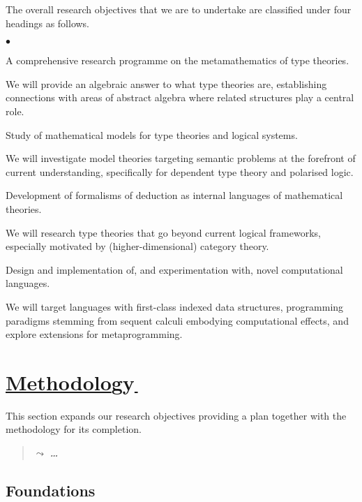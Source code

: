 \documentclass[11pt,twocolumn]{article}
\newenvironment{myitemize}
  {\begin{list}{$\bullet$}
  {\setlength{\topsep}{2pt}
   \setlength{\partopsep}{2pt}
   \setlength{\itemsep}{2.5pt}
   \setlength{\parsep}{2.5pt}
   \setlength{\leftmargin}{1em}
   \setlength{\labelwidth}{.5em}}}
  {\end{list}}
\newcommand{\note}[1]{\begin{quote}{\color{blue}$\leadsto$ \bf\em
      #1}\end{quote}}
\begin{document}
The overall research objectives that we are to undertake are classified
under four headings as follows.
\begin{myitemize}
\item[{\bfseries 1\enspace Foundations:}]\mbox{}\enspace\thinspace 
  A comprehensive research programme on the metamathematics of type theories.

  We will provide an algebraic answer to what type theories are, establishing
  connections with areas of abstract algebra where related structures play a
  central role.

\item[{\bfseries 2\enspace Models:}]\mbox{}\enspace\thinspace
  Study %
  of mathematical models for type theories and logical systems. 

  We will investigate model theories targeting semantic problems at the
  forefront of current understanding, specifically for dependent type theory
  and polarised logic.
  
\item[{\bfseries 3\enspace Calculi:}]\mbox{}\enspace\thinspace
  Development of formalisms of deduction as internal languages of mathematical
  theories.
  
  We will research type theories that go beyond current logical
  frameworks, especially motivated by (higher-dimensional) category theory.
  
\item[{\bfseries 4\enspace Programming:}]\mbox{}\enspace\thinspace
  Design and implementation of, and experimentation with, novel computational
  languages.  
  
  We will target languages with first-class indexed data structures,
  programming paradigms stemming from sequent calculi embodying
  computational effects, and explore extensions for metaprogramming.
\end{myitemize}

\section{\underline{Methodolo}gy\hspace{-1mm}\underline{\,}}
\label{MethodologySection}

This section expands our research objectives providing a plan together
with the methodology for its completion.

\note{\ldots}

\subsection{Foundations}
\label{Foundations}
\end{document}
